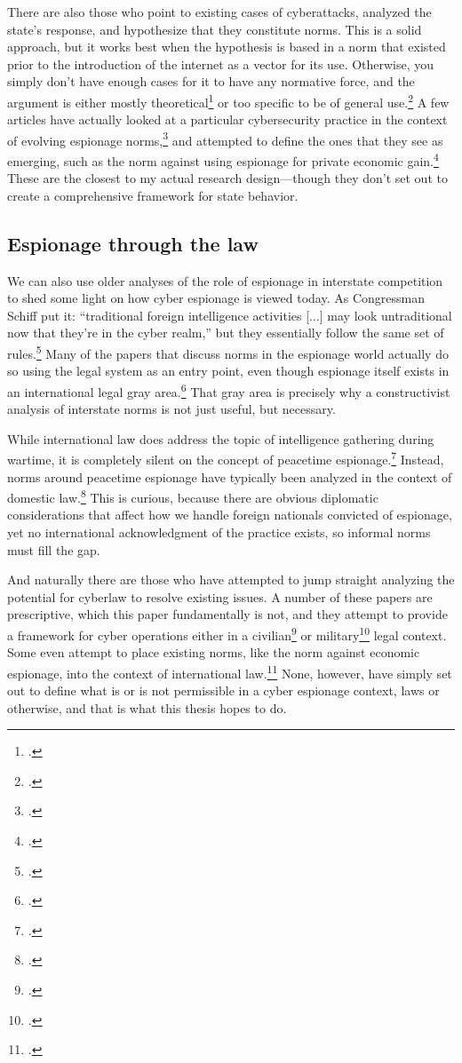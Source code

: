 \documentclass[12pt]{article}
\begin{document}
There are also those who point to existing cases of cyberattacks, analyzed the state's response, and hypothesize that they constitute norms. This is a solid approach, but it works best when the hypothesis is based in a norm that existed prior to the introduction of the internet as a vector for its use. Otherwise, you simply don't have enough cases for it to have any normative force, and the argument is either mostly theoretical\footcite{neutze_cyber_2013} or too specific to be of general use.\footcite{caso_rules_2014} A few articles have actually looked at a particular cybersecurity practice in the context of evolving espionage norms,\footcite{libicki_coming_2017} and attempted to define the ones that they see as emerging, such as the norm against using espionage for private economic gain.\footcite{rascoff_norm_2016} These are the closest to my actual research design---though they don't set out to create a comprehensive framework for state behavior.

\subsection{Espionage through the law}
We can also use older analyses of the role of espionage in interstate competition to shed some light on how cyber espionage is viewed today. As Congressman Schiff put it: ``traditional foreign intelligence activities [...] may look untraditional now that they’re in the cyber realm,'' but they essentially follow the same set of rules.\footcite{nakashima_hacks_2015} Many of the papers that discuss norms in the espionage world actually do so using the legal system as an entry point, even though espionage itself exists in an international legal gray area.\footcite{beim_enforcing_2018} That gray area is precisely why a constructivist analysis of interstate norms is not just useful, but necessary.

While international law does address the topic of intelligence gathering during wartime, it is completely silent on the concept of peacetime espionage.\footcite{radsan_unresolved_2007} Instead, norms around peacetime espionage have typically been analyzed in the context of domestic law.\footcite{demarest_espionage_1995} This is curious, because there are obvious diplomatic considerations that affect how we handle foreign nationals convicted of espionage, yet no international acknowledgment of the practice exists, so informal norms must fill the gap. 

And naturally there are those who have attempted to jump straight analyzing the potential for cyberlaw to resolve existing issues. A number of these papers are prescriptive, which this paper fundamentally is not, and they attempt to provide a framework for cyber operations either in a civilian\footcite{yurcik_internet_2001} or military\footcite{kehler_rules_2017} legal context. Some even attempt to place existing norms, like the norm against economic espionage, into the context of international law.\footcite{lotrionte_countering_2015} None, however, have simply set out to define what is or is not permissible in a cyber espionage context, laws or otherwise, and that is what this thesis hopes to do.
\end{document}
